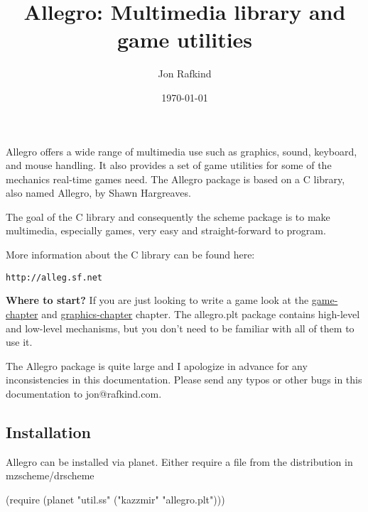 \documentclass{book}
\author{Jon Rafkind}
\title{Allegro: Multimedia library and game utilities}
\date{\today}
\begin{document}
 
\maketitle
\newcommand{\var}[1]{\scheme|#1|}
\newcommand{\num}[1]{\scheme|#1|}
\newcommand{\link}[1]{\hyperlink{#1}{#1}}
\newcommand{\makelink}[1]{\hypertarget{s_#1}{}\link{#1}\newline}
\newcommand{\mark}[1]{\index{#1}\hrule\hyperlink{s_#1}{top}\hypertarget{#1}{}\newline\newline}
\newcommand{\function}[2]{procedure: \scheme{#1 :: #2}}
\newcommand{\qfunction}[2]{\scheme{#1 :: #2}}

\begin{schemeregion}

Allegro offers a wide range of multimedia use such as graphics, sound, keyboard, and mouse handling. It also provides a set of game utilities for some of the mechanics real-time games need. The Allegro package is based on a C library, also named Allegro, by Shawn Hargreaves.

The goal of the C library and consequently the scheme package is to make multimedia, especially games, very easy and straight-forward to program. 

More information about the C library can be found here:

{\tt http://alleg.sf.net}

{\bf Where to start?}\newline
If you are just looking to write a game look at the \link{game-chapter} and \link{graphics-chapter} chapter. The allegro.plt package contains high-level and low-level mechanisms, but you don't need to be familiar with all of them to use it.

The Allegro package is quite large and I apologize in advance for any inconsistencies in this documentation. Please send any typos or other bugs in this documentation to jon@rafkind.com.

\subsection*{Installation}

Allegro can be installed via planet. Either require a file from the distribution in mzscheme/drscheme
\begin{schemedisplay}
(require (planet "util.ss" ("kazzmir" "allegro.plt")))
\end{schemedisplay}


\end{schemeregion}
\end{document}

